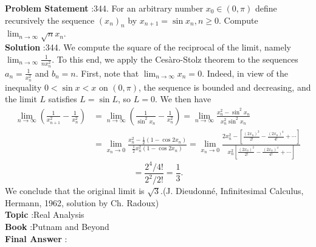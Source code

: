\documentclass[10pt]{article}
\begin{document}
\textbf{Problem Statement} :344. For an arbitrary number $x_{0} \in(0, \pi)$ define recursively the sequence $\left(x_{n}\right)_{n}$ by $x_{n+1}=\sin x_{n}, n \geq 0$. Compute $\lim _{n \rightarrow \infty} \sqrt{n} x_{n}$.\\
\textbf{Solution} :344. We compute the square of the reciprocal of the limit, namely $\lim _{n \rightarrow \infty} \frac{1}{n x_{n}^{2}}$. To this end, we apply the Cesàro-Stolz theorem to the sequences $a_{n}=\frac{1}{x_{n}^{2}}$ and $b_{n}=n$. First, note that $\lim _{n \rightarrow \infty} x_{n}=0$. Indeed, in view of the inequality $0<\sin x<x$ on $(0, \pi)$, the sequence is bounded and decreasing, and the limit $L$ satisfies $L=\sin L$, so $L=0$. We then have$$ \begin{aligned} \lim _{n \rightarrow \infty}\left(\frac{1}{x_{n+1}^{2}}-\frac{1}{x_{n}^{2}}\right) &=\lim _{n \rightarrow \infty}\left(\frac{1}{\sin ^{2} x_{n}}-\frac{1}{x_{n}^{2}}\right)=\lim _{n \rightarrow \infty} \frac{x_{n}^{2}-\sin ^{2} x_{n}}{x_{n}^{2} \sin ^{2} x_{n}} \\ &=\lim _{x_{n} \rightarrow 0} \frac{x_{n}^{2}-\frac{1}{2}\left(1-\cos 2 x_{n}\right)}{\frac{1}{2} x_{n}^{2}\left(1-\cos 2 x_{n}\right)}=\lim _{x_{n} \rightarrow 0} \frac{2 x_{n}^{2}-\left[\frac{\left(2 x_{n}\right)^{2}}{2 !}-\frac{\left(2 x_{n}\right)^{4}}{4 !}+\cdots\right]}{x_{n}^{2}\left[\frac{\left(2 x_{n}\right)^{2}}{2 !}-\frac{\left(2 x_{n}\right)^{4}}{4 !}+\cdots\right]} \end{aligned} $$$$ =\frac{2^{4} / 4 !}{2^{2} / 2 !}=\frac{1}{3} . $$We conclude that the original limit is $\sqrt{3}$.(J. Dieudonné, Infinitesimal Calculus, Hermann, 1962, solution by Ch. Radoux)\\
\textbf{Topic} :Real Analysis\\
\textbf{Book} :Putnam and Beyond\\
\textbf{Final Answer} :\\
\end{document}
